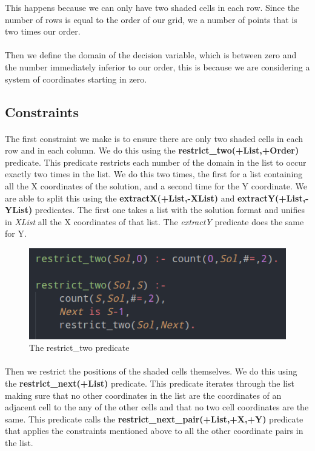 \documentclass[runningheads]{llncs}
\begin{document}
This happens because we can only have two shaded cells in each row. Since the number of rows is equal to the order of our
grid, we a number of points that is two times our order.

\paragraph{}
Then we define the domain of the decision variable, which is between zero and the number immediately inferior to our order,
this is because we are considering a system of coordinates starting in zero.

\subsection{Constraints}
\paragraph{}
The first constraint we make is to ensure there are only two shaded cells in each row and in each column. We do this
using the \textbf{restrict\_two(+List,+Order)} predicate. This predicate restricts each number of the domain in the list
to occur exactly two times in the list. We do this two times, the first for a list containing all the X coordinates of the
solution, and a second time for the Y coordinate. We are able to split this using the \textbf{extractX(+List,-XList)} and
\textbf{extractY(+List,-YList)} predicates. The first one takes a list with the solution format and unifies in
\textit{XList} all the X coordinates of that list. The \textit{extractY} predicate does the same for Y.

\begin{figure}
    \begin{center}
        \includegraphics[scale=0.5]{images/restrict_two.png}
        \caption{The restrict\_two predicate} \label{fig2}
    \end{center}
\end{figure}

\paragraph{}
Then we restrict the positions of the shaded cells themselves. We do this using the \textbf{restrict\_next(+List)} predicate.
This predicate iterates through the list making sure that no other coordinates in the list are the coordinates of an
adjacent cell to the any of the other cells and that no two cell coordinates are the same. This predicate calls the
\textbf{restrict\_next\_pair(+List,+X,+Y)} predicate that applies the constraints mentioned above to all the other
coordinate pairs in the list.
\end{document}
